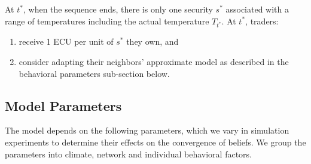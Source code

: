 \documentclass{article}\usepackage[]{graphicx}\usepackage[]{color}
\begin{document}
At $t^*$, when the sequence ends, there is only one security $s^*$ associated with a range of temperatures including the actual temperature $T_{t^*}$. 
At $t^*$, traders:

\begin{enumerate}
  \item  receive 1 ECU per unit of $s^*$ they own, and
  \item consider adapting their neighbors' approximate model as described in the behavioral parameters sub-section below.
\end{enumerate}

\subsection{Model Parameters}
  
The model depends on the following parameters, which we vary in simulation experiments to determine their effects on the convergence of beliefs. We group the parameters into climate, network and individual behavioral factors.
\end{document}
